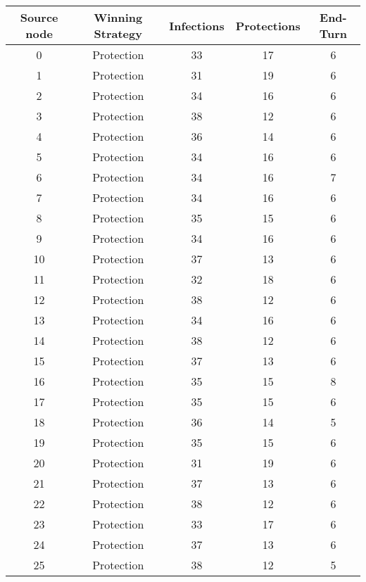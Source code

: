 \documentclass[results.tex]{subfiles}
\begin{document}
\begin{center}
  \begin{tabular}{| c || c | c | c | c |}
    \hline
    {\bfseries Source node} & {\bfseries Winning Strategy} & {\bfseries Infections} & {\bfseries Protections} & {\bfseries End-Turn} \\  %
    \hline\hline
    0 & Protection & 33 & 17 & 6 \\ 
    \hline
    1 & Protection & 31 & 19 & 6 \\ 
    \hline
    2 & Protection & 34 & 16 & 6 \\ 
    \hline
    3 & Protection & 38 & 12 & 6 \\ 
    \hline
    4 & Protection & 36 & 14 & 6 \\ 
    \hline
    5 & Protection & 34 & 16 & 6 \\ 
    \hline
    6 & Protection & 34 & 16 & 7 \\ 
    \hline
    7 & Protection & 34 & 16 & 6 \\ 
    \hline
    8 & Protection & 35 & 15 & 6 \\ 
    \hline
    9 & Protection & 34 & 16 & 6 \\ 
    \hline
    10 & Protection & 37 & 13 & 6 \\ 
    \hline
    11 & Protection & 32 & 18 & 6 \\ 
    \hline
    12 & Protection & 38 & 12 & 6 \\ 
    \hline
    13 & Protection & 34 & 16 & 6 \\ 
    \hline
    14 & Protection & 38 & 12 & 6 \\ 
    \hline
    15 & Protection & 37 & 13 & 6 \\ 
    \hline
    16 & Protection & 35 & 15 & 8 \\ 
    \hline
    17 & Protection & 35 & 15 & 6 \\ 
    \hline
    18 & Protection & 36 & 14 & 5 \\ 
    \hline
    19 & Protection & 35 & 15 & 6 \\ 
    \hline
    20 & Protection & 31 & 19 & 6 \\ 
    \hline
    21 & Protection & 37 & 13 & 6 \\ 
    \hline
    22 & Protection & 38 & 12 & 6 \\ 
    \hline
    23 & Protection & 33 & 17 & 6 \\ 
    \hline
    24 & Protection & 37 & 13 & 6 \\ 
    \hline
    25 & Protection & 38 & 12 & 5 \\ 

\end{tabular}
\end{center}
\end{document}

